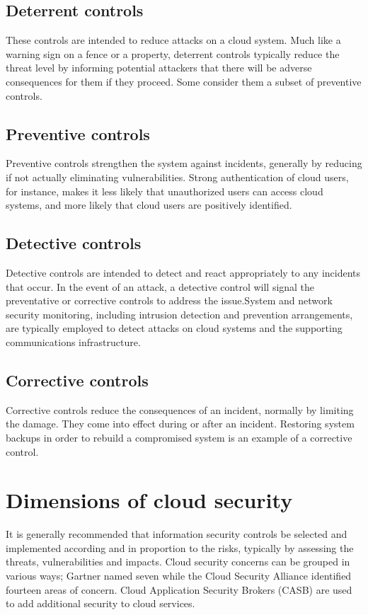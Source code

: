 \documentclass[11pt,a4paper]{report}
\begin{document}
\subsection{Deterrent controls} 
These controls are intended to reduce attacks on a cloud system.
Much like a warning sign on a fence or a property, deterrent controls typically reduce the threat level by informing potential attackers that there will be adverse consequences for them if they proceed.
Some consider them a subset of preventive controls.
\subsection*{Preventive controls}
Preventive controls strengthen the system against incidents, generally by reducing if not actually eliminating vulnerabilities.
Strong authentication of cloud users, for instance, makes it less likely that unauthorized users can access cloud systems, and more likely that cloud users are positively identified.
\subsection*{Detective controls}
Detective controls are intended to detect and react appropriately to any incidents that occur.
In the event of an attack, a detective control will signal the preventative or corrective controls to address the issue.System and network security monitoring, including intrusion detection and prevention arrangements, are typically employed to detect attacks on cloud systems and the supporting communications infrastructure.
\subsection*{Corrective controls} 
Corrective controls reduce the consequences of an incident, normally by limiting the damage.
They come into effect during or after an incident.
Restoring system backups in order to rebuild a compromised system is an example of a corrective control.
\section{Dimensions of cloud security}
It is generally recommended that information security controls be selected and implemented according and in proportion to the risks, typically by assessing the threats, vulnerabilities and impacts.
Cloud security concerns can be grouped in various ways;
Gartner named seven while the Cloud Security Alliance identified fourteen areas of concern.
Cloud Application Security Brokers (CASB) are used to add additional security to cloud services.
\end{document}
